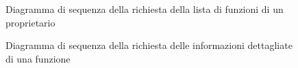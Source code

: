 \begin{figure}[H]
	\noindent
	\caption{Diagramma di sequenza della richiesta della lista di funzioni di un proprietario}
\end{figure}

\begin{figure}[H]
	\noindent
	\caption{Diagramma di sequenza della richiesta delle informazioni dettagliate di una funzione}
\end{figure}


